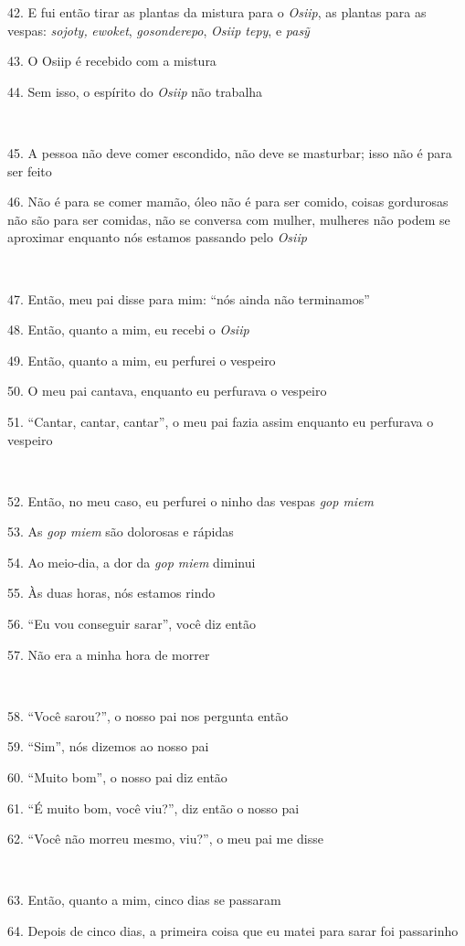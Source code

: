 42. E fui então tirar as plantas da mistura para o \emph{Osiip}, as
plantas para as vespas: \emph{sojoty,} \emph{ewoket},
\emph{gosonderepo}, \emph{Osiip tepy}, e \emph{pasỹ}

43. O Osiip é recebido com a mistura

44. Sem isso, o espírito do \emph{Osiip} não trabalha

~

45. A pessoa não deve comer escondido, não deve se masturbar; isso não é
para ser feito

46. Não é para se comer mamão, óleo não é para ser comido, coisas
gordurosas não são para ser comidas, não se conversa com mulher,
mulheres não podem se aproximar enquanto nós estamos passando pelo
\emph{Osiip}

~

47. Então, meu pai disse para mim: ``nós ainda não terminamos''

48. Então, quanto a mim, eu recebi o \emph{Osiip}

49. Então, quanto a mim, eu perfurei o vespeiro

50. O meu pai cantava, enquanto eu perfurava o vespeiro

51. ``Cantar, cantar, cantar'', o meu pai fazia assim enquanto eu perfurava o vespeiro

~

52. Então, no meu caso, eu perfurei o ninho das vespas \emph{gop miem}

53. As \emph{gop miem} são dolorosas e rápidas

54. Ao meio-dia, a dor da \emph{gop miem} diminui

55. Às duas horas, nós estamos rindo

56. ``Eu vou conseguir sarar'', você diz então

57. Não era a minha hora de morrer

~

58. ``Você sarou?'', o nosso pai nos pergunta então

59. ``Sim'', nós dizemos ao nosso pai

60. ``Muito bom'', o nosso pai diz então

61. ``É muito bom, você viu?'', diz então o nosso pai

62. ``Você não morreu mesmo, viu?'', o meu pai me disse

~

63. Então, quanto a mim, cinco dias se passaram

64. Depois de cinco dias, a primeira coisa que eu matei para sarar foi
passarinho

